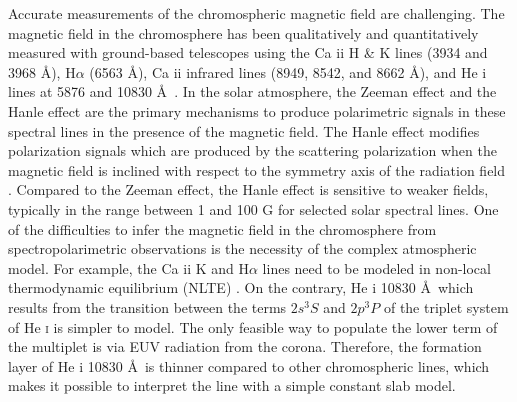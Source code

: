 \documentclass[manuscript]{aastex61}
\begin{document}
Accurate measurements of the chromospheric magnetic field are challenging. 
The magnetic field in the chromosphere has been qualitatively and quantitatively measured with ground-based telescopes using the Ca {\sc ii} H \& K lines (3934 and 3968 \AA), H$\alpha$ (6563 \AA), Ca {\sc ii}
infrared lines (8949, 8542, and 8662 \AA), and He {\sc i} lines at 5876 and 10830
\AA\ \citep[see the review of][]{2017SSRv..210..109D}.
In the solar atmosphere, the Zeeman effect and the Hanle effect are the
primary mechanisms to produce polarimetric signals in these spectral lines in
the presence of the magnetic field. The Hanle effect modifies polarization
signals which are produced by the scattering polarization when the magnetic field is
inclined with respect to the symmetry axis of the radiation field
\citep[e.g.,][]{2001ASPC..236..161T}. Compared to the Zeeman effect, the Hanle effect is
sensitive to weaker fields, typically in the range between 1 and 100 G for selected solar
spectral lines. One of the difficulties to infer the magnetic field in the
chromosphere from spectropolarimetric observations is the necessity of
the complex atmospheric model. For example, the Ca {\sc ii} K and H$\alpha$ lines
need to be modeled in non-local thermodynamic equilibrium (NLTE)
\citep{1981ApJS...45..635V}. On the contrary, He {\sc i} 10830 \AA\, which results from the
transition between the terms $2s^3S$ and $2p^3P$ of the triplet system of He \textsc{i} is
simpler to model. The
only feasible way to populate the lower term of the multiplet is via EUV radiation from the corona.
Therefore, the formation layer of He {\sc i} 10830 \AA \ is thinner compared to
other chromospheric lines, which makes it possible to interpret the line with
a simple constant slab model.
 
\end{document}
